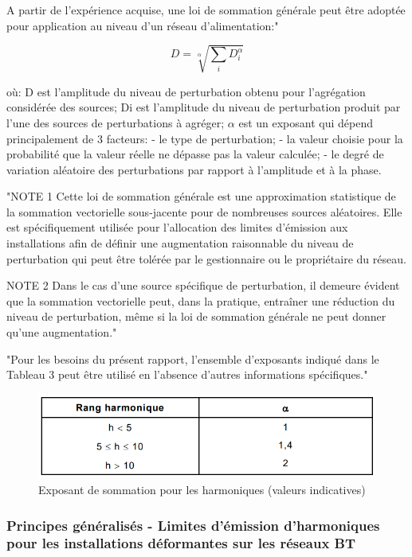 A partir de l'expérience acquise, une loi de sommation générale peut être adoptée pour application au niveau d'un réseau d'alimentation:"

\begin{equation}
    D = \sqrt[\alpha]{\sum_i D_i^\alpha}
\end{equation}

où:
D est l'amplitude du niveau de perturbation obtenu pour l'agrégation considérée des sources;
Di est l'amplitude du niveau de perturbation produit par l'une des sources de perturbations à agréger;
$\alpha$ est un exposant qui dépend principalement de 3 facteurs:
- le type de perturbation;
- la valeur choisie pour la probabilité que la valeur réelle ne dépasse pas la valeur calculée;
- le degré de variation aléatoire des perturbations par rapport à l'amplitude et à la phase.


"NOTE 1 Cette loi de sommation générale est une approximation statistique de la sommation vectorielle sous-jacente pour de nombreuses sources aléatoires. Elle est spécifiquement utilisée pour l'allocation des limites d'émission aux installations afin de définir une augmentation raisonnable du niveau de perturbation qui peut être tolérée par le gestionnaire ou le propriétaire du réseau.

NOTE 2 Dans le cas d'une source spécifique de perturbation, il demeure évident que la sommation vectorielle peut, dans la pratique, entraîner une réduction du niveau de perturbation, même si la loi de sommation générale ne peut donner qu'une augmentation."

"Pour les besoins du présent rapport, l'ensemble d'exposants indiqué dans le Tableau 3 peut être utilisé en l'absence d'autres informations spécifiques."
\begin{figure}[H]
    \begin{center}
        \includegraphics[width=\textwidth]{assets/figures/IECTR61000_tab4.png}
    \end{center}
    \caption{Exposant de sommation pour les harmoniques (valeurs indicatives)}
    \label{IECTR61000_tab4}
\end{figure}

\subsubsection{Principes généralisés - Limites d'émission d'harmoniques pour les installations déformantes sur les réseaux BT}

